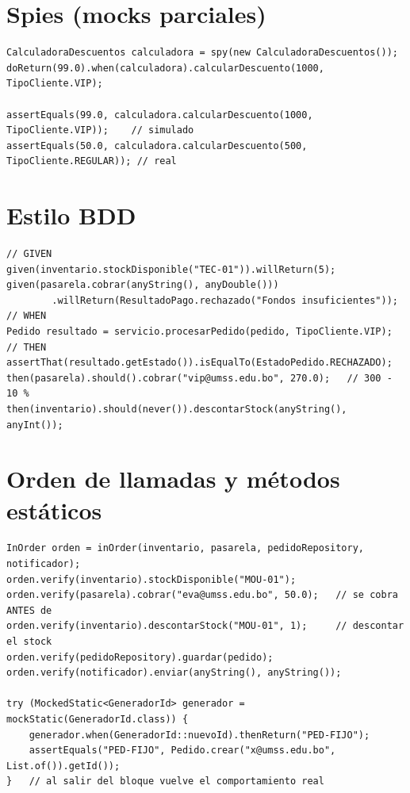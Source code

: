 \documentclass[11pt,a4paper,oneside]{report}
\newcommand{\code}[1]{\texttt{#1}}
\begin{document}
\section{Spies (mocks parciales)}
\begin{lstlisting}[caption={\code{E05\_SpyTest} (extracto)}]
CalculadoraDescuentos calculadora = spy(new CalculadoraDescuentos());
doReturn(99.0).when(calculadora).calcularDescuento(1000, TipoCliente.VIP);

assertEquals(99.0, calculadora.calcularDescuento(1000, TipoCliente.VIP));    // simulado
assertEquals(50.0, calculadora.calcularDescuento(500, TipoCliente.REGULAR)); // real
\end{lstlisting}

\section{Estilo BDD}
\begin{lstlisting}[caption={\code{E06\_BDDMockitoTest} (extracto)}]
// GIVEN
given(inventario.stockDisponible("TEC-01")).willReturn(5);
given(pasarela.cobrar(anyString(), anyDouble()))
        .willReturn(ResultadoPago.rechazado("Fondos insuficientes"));
// WHEN
Pedido resultado = servicio.procesarPedido(pedido, TipoCliente.VIP);
// THEN
assertThat(resultado.getEstado()).isEqualTo(EstadoPedido.RECHAZADO);
then(pasarela).should().cobrar("vip@umss.edu.bo", 270.0);   // 300 - 10 %
then(inventario).should(never()).descontarStock(anyString(), anyInt());
\end{lstlisting}

\section{Orden de llamadas y métodos estáticos}
\begin{lstlisting}[caption={\code{E07\_OrdenYStaticTest} (extracto)}]
InOrder orden = inOrder(inventario, pasarela, pedidoRepository, notificador);
orden.verify(inventario).stockDisponible("MOU-01");
orden.verify(pasarela).cobrar("eva@umss.edu.bo", 50.0);   // se cobra ANTES de
orden.verify(inventario).descontarStock("MOU-01", 1);     // descontar el stock
orden.verify(pedidoRepository).guardar(pedido);
orden.verify(notificador).enviar(anyString(), anyString());

try (MockedStatic<GeneradorId> generador = mockStatic(GeneradorId.class)) {
    generador.when(GeneradorId::nuevoId).thenReturn("PED-FIJO");
    assertEquals("PED-FIJO", Pedido.crear("x@umss.edu.bo", List.of()).getId());
}   // al salir del bloque vuelve el comportamiento real
\end{lstlisting}
\end{document}
